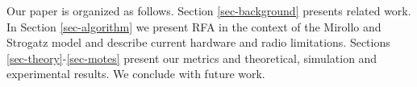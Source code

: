Our paper is organized as follows. Section \ref{sec-background}
presents related work. In Section \ref{sec-algorithm} we present RFA
in the context of the Mirollo and Strogatz model and describe current
hardware and radio limitations. Sections
\ref{sec-theory}-\ref{sec-motes} present our metrics and theoretical,
simulation and experimental results. We conclude with future work.



